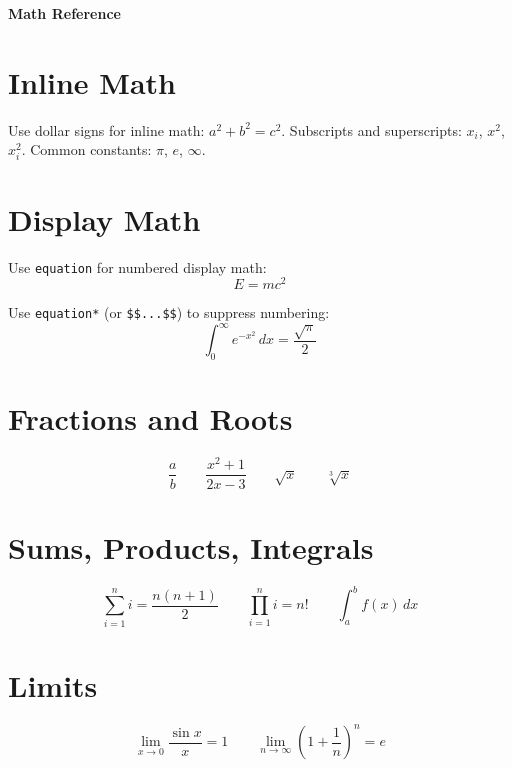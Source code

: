 \documentclass[11pt]{article}
\begin{document}
\centerline{\Large\bf Math Reference}\par
\bigskip

\section{Inline Math}

Use dollar signs for inline math: $a^2 + b^2 = c^2$.
Subscripts and superscripts: $x_i$, $x^2$, $x_i^2$.
Common constants: $\pi$, $e$, $\infty$.

\section{Display Math}

Use \texttt{equation} for numbered display math:
\begin{equation}
    E = mc^2
\end{equation}

Use \texttt{equation*} (or \texttt{\$\$...\$\$}) to suppress numbering:
\begin{equation*}
    \int_0^\infty e^{-x^2}\, dx = \frac{\sqrt{\pi}}{2}
\end{equation*}

\section{Fractions and Roots}

\begin{equation*}
    \frac{a}{b} \qquad \frac{x^2 + 1}{2x - 3} \qquad \sqrt{x} \qquad \sqrt[3]{x}
\end{equation*}

\section{Sums, Products, Integrals}

\begin{equation*}
    \sum_{i=1}^{n} i = \frac{n(n+1)}{2}
    \qquad
    \prod_{i=1}^{n} i = n!
    \qquad
    \int_a^b f(x)\, dx
\end{equation*}

\section{Limits}

\begin{equation*}
    \lim_{x \to 0} \frac{\sin x}{x} = 1
    \qquad
    \lim_{n \to \infty} \left(1 + \frac{1}{n}\right)^n = e
\end{equation*}
\end{document}

